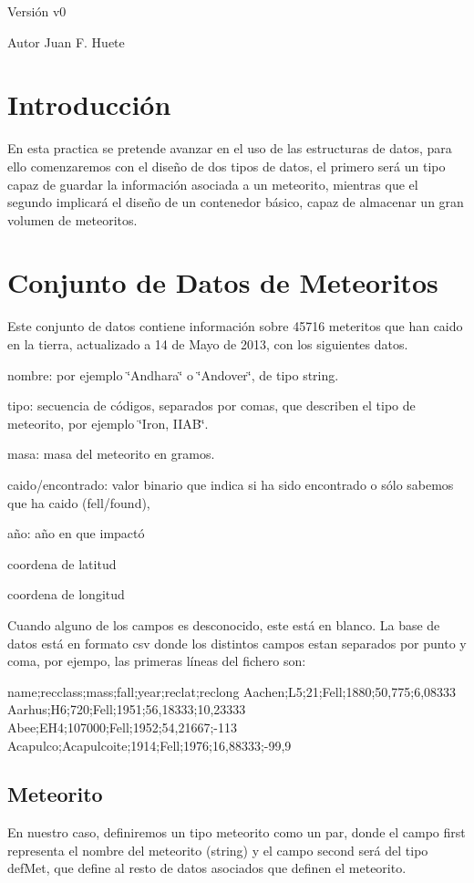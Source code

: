 \begin{DoxyVersion}{Versión}
v0 
\end{DoxyVersion}
\begin{DoxyAuthor}{Autor}
Juan F. Huete
\end{DoxyAuthor}
\hypertarget{index_intro_sec}{}\section{Introducción}\label{index_intro_sec}
En esta practica se pretende avanzar en el uso de las estructuras de datos, para ello comenzaremos con el diseño de dos tipos de datos, el primero será un tipo capaz de guardar la información asociada a un meteorito, mientras que el segundo implicará el diseño de un contenedor básico, capaz de almacenar un gran volumen de meteoritos.\hypertarget{index_meteorito}{}\section{Conjunto de Datos de Meteoritos}\label{index_meteorito}
Este conjunto de datos contiene información sobre 45716 meteritos que han caido en la tierra, actualizado a 14 de Mayo de 2013, con los siguientes datos.

\begin{DoxyItemize}
\item nombre\-: por ejemplo \char`\"{}\-Andhara\char`\"{} o \char`\"{}\-Andover\char`\"{}, de tipo string. \item tipo\-: secuencia de códigos, separados por comas, que describen el tipo de meteorito, por ejemplo \char`\"{}\-Iron, I\-I\-A\-B\char`\"{}. \item masa\-: masa del meteorito en gramos. \item caido/encontrado\-: valor binario que indica si ha sido encontrado o sólo sabemos que ha caido (fell/found), \item año\-: año en que impactó \item coordena de latitud \item coordena de longitud\end{DoxyItemize}
Cuando alguno de los campos es desconocido, este está en blanco. La base de datos está en formato csv donde los distintos campos estan separados por punto y coma, por ejempo, las primeras líneas del fichero son\-:


\begin{DoxyCode}
name;recclass;mass;fall;year;reclat;reclong
Aachen;L5;21;Fell;1880;50,775;6,08333
Aarhus;H6;720;Fell;1951;56,18333;10,23333
Abee;EH4;107000;Fell;1952;54,21667;-113
Acapulco;Acapulcoite;1914;Fell;1976;16,88333;-99,9
\end{DoxyCode}
\hypertarget{index_met}{}\subsection{Meteorito}\label{index_met}
En nuestro caso, definiremos un tipo meteorito como un par, donde el campo first representa el nombre del meteorito (string) y el campo second será del tipo def\-Met, que define al resto de datos asociados que definen el meteorito.


